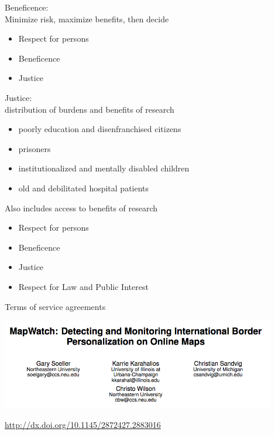 \documentclass{beamer}
\def\vf{\vfill}
\begin{document}
\begin{frame}

Beneficence:\\
Minimize risk, maximize benefits, then decide

\end{frame}
\begin{frame}

\begin{itemize}
\item Respect for persons
\item Beneficence
\item Justice
\end{itemize}

\end{frame}
\begin{frame}

Justice:\\
distribution of burdens and benefits of research
\pause
\begin{itemize}
\item poorly education and disenfranchised citizens
\item prisoners
\item institutionalized and mentally disabled children
\item old and debilitated hospital patients
\end{itemize}
\pause
Also includes access to benefits of research

\end{frame}
\begin{frame}

\begin{itemize}
\item Respect for persons
\item Beneficence
\item Justice
\item Respect for Law and Public Interest
\end{itemize}

\end{frame}
\begin{frame}

Terms of service agreements

\end{frame}
\begin{frame}

\begin{center}
\includegraphics[width=0.9\textwidth]{figures/soeller_mapwatch_2016_title.png}
\end{center}

\vf
\url{http://dx.doi.org/10.1145/2872427.2883016}
\end{frame}
\end{document}
